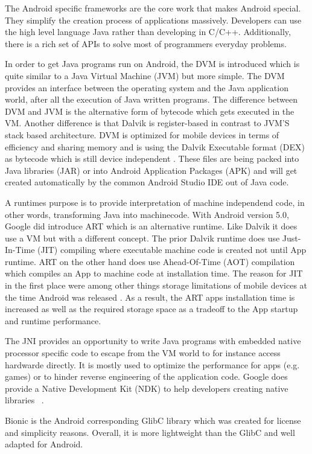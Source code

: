 The Android specific frameworks are the core work that makes Android
special. They simplify the creation process of applications massively.
Developers can use the high level language Java rather than developing
in C/C++. Additionally, there is a rich set of APIs to solve most of
programmers everyday problems.

In order to get Java programs run on Android, the DVM is introduced
which is quite similar to a Java Virtual Machine (JVM) but more simple.
The DVM provides an interface between the operating system and
the Java application world, after all the execution of Java written programs.
The difference between DVM and JVM is the alternative form of bytecode
which gets executed in the VM. Another difference is that Dalvik is
register-based in contrast to JVM'S stack based architecture.
DVM is optimized for mobile devices
in terms of efficiency and sharing memory and is using the
Dalvik Executable format (DEX) as bytecode which is still device
independent \parencite[p.11f]{levin}. These  files are being
packed into Java libraries (JAR) or into Android Application Packages (APK)
and will get created automatically by the common Android Studio IDE out
of Java code.

A runtimes purpose is to provide
interpretation of machine independend code, in other words,
transforming Java into machinecode.
With Android version 5.0, Google did introduce ART which is an
alternative runtime. Like Dalvik it does use a VM but with a
different concept.
The prior Dalvik runtime does use Just-In-Time (JIT) compiling
where executable machine code is created not until App runtime.
ART on the other hand does use Ahead-Of-Time (AOT) compilation
which compiles an App to machine code at installation time.
The reason for JIT in the first place were among other things
storage limitations of mobile devices at the time Android was released
\parencite[p.11f]{levin}. As a result, the ART apps installation time
is increased as well as the required storage space as a tradeoff
to the App startup and runtime performance.

The JNI provides an opportunity to write Java programs with embedded
native processor specific code to escape from the VM world to for
instance access hardwarde directly.
It is mostly used to optimize the performance for apps (e.g. games)
or to hinder reverse engineering of the application code.
Google does provide a Native Development Kit (NDK) to help
developers creating native libraries ~\parencite{ndk}.

Bionic is the Android corresponding GlibC library which was created
for license and simplicity reasons. Overall, it is more lightweight
than the GlibC and well adapted for Android.


